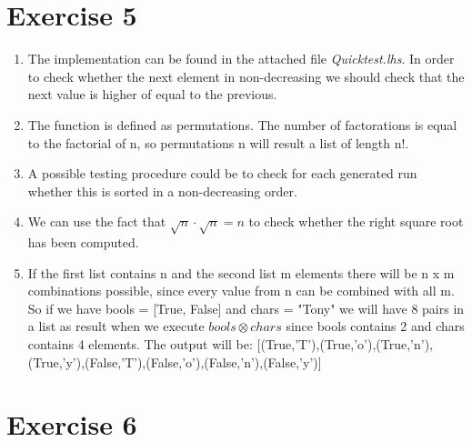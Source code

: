 \documentclass{article}
\begin{document}
\section*{Exercise 5}
\begin{enumerate}
  \item The implementation can be found in the attached file \emph{Quicktest.lhs}. In order to check whether the next element in non-decreasing we should check that the next value is higher of equal to the previous.
  \item The function is defined as permutations. The number of factorations is equal to the factorial of n, so permutations n will result a list of length n!.
  \item A possible testing procedure could be to check for each generated run whether this is sorted in a non-decreasing order.
  \item We can use the fact that $\sqrt{n} \cdot \sqrt{n} = n$ to check whether the right square root has been computed.
  \item If the first list contains n and the second list m elements there will be n x m combinations possible, since every value from n can be combined with all m. So if we have bools = [True, False] and chars = "Tony" we will have 8 pairs in a list as result when we execute $bools \otimes chars$ since bools contains 2 and chars contains 4 elements. The output will be:  [(True,'T'),(True,'o'),(True,'n'),(True,'y'),(False,'T'),(False,'o'),(False,'n'),(False,'y')]
\end{enumerate}

\section*{Exercise 6}
\end{document}
